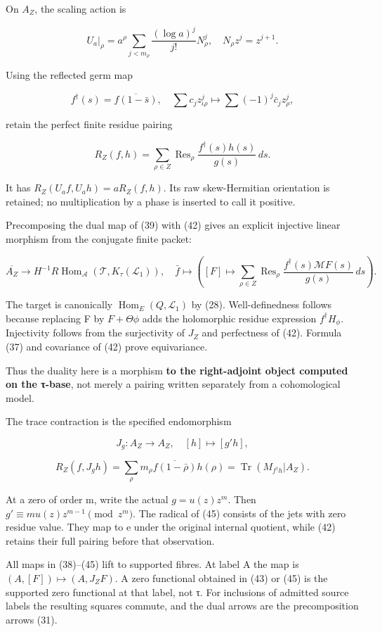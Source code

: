 \documentclass{article}
\begin{document}
On \(A_Z\), the scaling action is

\[
U_a|_\rho=a^\rho\sum_{j<m_\rho}\frac{(\log a)^j}{j!}N_\rho^j,
\quad N_\rho z^j=z^{j+1}.
\tag{40}
\]

Using the reflected germ map

\[
f^\dagger(s)=\overline{f(1-\bar s)},
\quad
\sum c_jz_{\iota\rho}^j\mapsto\sum(-1)^j\bar c_jz_\rho^j,
\tag{41}
\]

retain the perfect finite residue pairing

\[
R_Z(f,h)=\sum_{\rho\in Z}\operatorname{Res}_\rho
\frac{f^\dagger(s)h(s)}{g(s)}\,ds.
\tag{42}
\]

It has \(R_Z(U_af,U_ah)=aR_Z(f,h)\). Its raw skew-Hermitian orientation is retained; no multiplication by a phase is inserted to call it positive.

Precomposing the dual map of (39) with (42) gives an explicit injective linear morphism from the conjugate finite packet:

\[
\boxed{
\overline{A_Z}\longrightarrow
H^{-1}R\operatorname{Hom}_{\mathcal A}(\mathcal T,K_\tau(\mathcal L_1)),
\quad
\bar f\longmapsto
\left([F]\longmapsto\sum_{\rho\in Z}\operatorname{Res}_\rho
\frac{f^\dagger(s)\mathcal MF(s)}{g(s)}\,ds\right).
}
\tag{43}
\]

The target is canonically \(\operatorname{Hom}_E(Q,\mathcal L_1)\) by (28). Well-definedness follows because replacing F by \(F+\Theta\phi\) adds the holomorphic residue expression \(f^\dagger H_\phi\). Injectivity follows from the surjectivity of \(J_Z\) and perfectness of (42). Formula (37) and covariance of (42) prove equivariance.

Thus the duality here is a morphism \textbf{to the right-adjoint object computed on the τ-base}, not merely a pairing written separately from a cohomological model.

The trace contraction is the specified endomorphism

\[
J_g:A_Z\to A_Z,\quad[h]\mapsto[g'h],
\tag{44}
\]

\[
R_Z(f,J_gh)=\sum_\rho m_\rho\overline{f(1-\bar\rho)}h(\rho)
=\operatorname{Tr}(M_{f^\dagger h}|A_Z).
\tag{45}
\]

At a zero of order m, write the actual \(g=u(z)z^m\). Then \(g'\equiv m u(z)z^{m-1}\pmod{z^m}\). The radical of (45) consists of the jets with zero residue value. They map to e under the original internal quotient, while (42) retains their full pairing before that observation.

All maps in (38)--(45) lift to supported fibres. At label A the map is \((A,[F])\mapsto(A,J_ZF)\). A zero functional obtained in (43) or (45) is the supported zero functional at that label, not τ. For inclusions of admitted source labels the resulting squares commute, and the dual arrows are the precomposition arrows (31).
\end{document}
